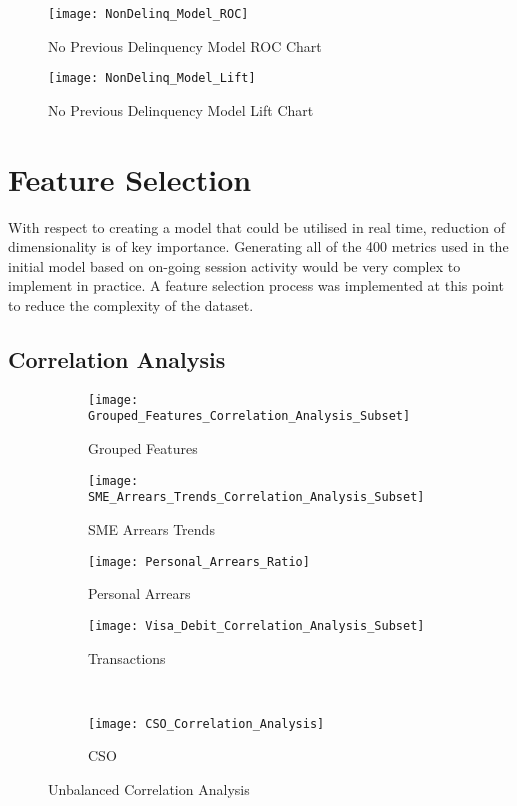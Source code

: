 \begin{figure}[H]
	\texttt{[image: NonDelinq\_Model\_ROC]}
	\caption{No Previous Delinquency Model ROC Chart}
	\label{fig:NonDelinq_Model_ROC}
\end{figure}

\begin{figure}[H]
	\texttt{[image: NonDelinq\_Model\_Lift]}
	\caption{No Previous Delinquency Model Lift Chart}
	\label{fig:NonDelinq_Model_Lift}
\end{figure}

\section{Feature Selection}
With respect to creating a model that could be utilised in real time, reduction of dimensionality is of key importance. Generating all of the 400 metrics used in the initial model based on on-going session activity would be very complex to implement in practice. A feature selection process was implemented at this point to reduce the complexity of the dataset. 

\subsection{Correlation Analysis}

\begin{figure}[H]
	\centering
		\begin{subfigure}[b]{0.32\textwidth}
			\captionsetup{font=scriptsize}
			\texttt{[image: Grouped\_Features\_Correlation\_Analysis\_Subset]}\caption{Grouped Features}\label{fig:groupedFeaturesCorrelation}
		\end{subfigure} 
		\begin{subfigure}[b]{0.32\textwidth}
			\captionsetup{font=scriptsize}
			\texttt{[image: SME\_Arrears\_Trends\_Correlation\_Analysis\_Subset]}
			\caption{SME Arrears Trends}\label{fig:smeArrearsCorrelation}
		\end{subfigure} 
		\begin{subfigure}[b]{0.32\textwidth}
			\captionsetup{font=scriptsize}
			\texttt{[image: Personal\_Arrears\_Ratio]}
			\caption{Personal Arrears}\label{fig:personalArrearsCorrelation}
		\end{subfigure} 
	\medskip
	\begin{subfigure}[b]{0.32\textwidth}
		\captionsetup{font=scriptsize}
		\texttt{[image: Visa\_Debit\_Correlation\_Analysis\_Subset]}
		\caption{Transactions}\label{fig:transVisaCorrelation}
	\end{subfigure} ~\quad
	\begin{subfigure}[b]{0.32\textwidth}
		\captionsetup{font=scriptsize}
		\texttt{[image: CSO\_Correlation\_Analysis]}
		\caption{CSO}\label{fig:CSOCorrelation}
	\end{subfigure}
\caption{Unbalanced Correlation Analysis}
\label{fig:unbal_corr_analysis}
\end{figure}
	

